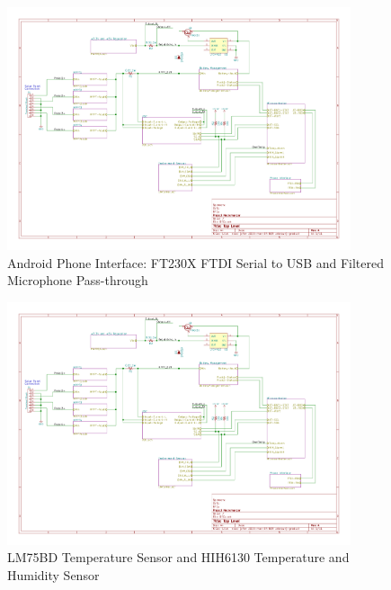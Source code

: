 \documentclass{article}
\numberwithin{figure}{section}
\numberwithin{equation}{section}
\begin{document}
{\begin{figure}[H]
	\centering
	\includegraphics[page=7,width=0.9\textwidth]{RFCxSchematics.pdf}
	\caption{Android Phone Interface: FT230X FTDI Serial to USB and Filtered Microphone Pass-through}
	\label{fig:schemp7}
\end{figure}


%
%

\begin{figure}[H]
	\centering
	\includegraphics[page=11,width=0.9\textwidth]{RFCxSchematics.pdf}
	\caption{LM75BD Temperature Sensor and HIH6130 Temperature and Humidity Sensor}
	\label{fig:schemp11}
\end{figure}

}
\end{document}
